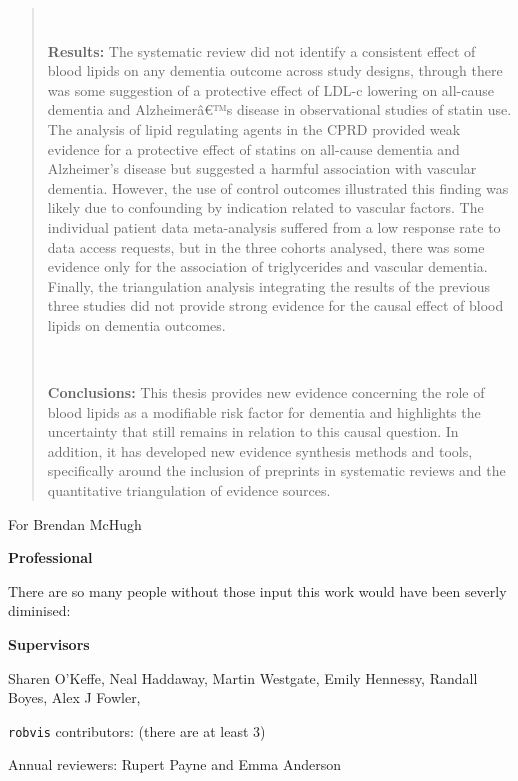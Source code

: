 \documentclass[a4paper, twoside]{templates/ociamthesis}
\begin{document}
\begin{romanpages}
\begin{abstract}
 ~

 \textbf{Results:} The systematic review did not identify a consistent effect of blood lipids on any dementia outcome across study designs, through there was some suggestion of a protective effect of LDL-c lowering on all-cause dementia and Alzheimerâ€™s disease in observational studies of statin use. The analysis of lipid regulating agents in the CPRD provided weak evidence for a protective effect of statins on all-cause dementia and Alzheimer's disease but suggested a harmful association with vascular dementia. However, the use of control outcomes illustrated this finding was likely due to confounding by indication related to vascular factors. The individual patient data meta-analysis suffered from a low response rate to data access requests, but in the three cohorts analysed, there was some evidence only for the association of triglycerides and vascular dementia. Finally, the triangulation analysis integrating the results of the previous three studies did not provide strong evidence for the causal effect of blood lipids on dementia outcomes.

 ~

 \textbf{Conclusions:}
 This thesis provides new evidence concerning the role of blood lipids as a modifiable risk factor for dementia and highlights the uncertainty that still remains in relation to this causal question. In addition, it has developed new evidence synthesis methods and tools, specifically around the inclusion of preprints in systematic reviews and the quantitative triangulation of evidence sources.
\end{abstract}

\begin{dedication}
  For Brendan McHugh
\end{dedication}

\begin{acknowledgements}
 	\textbf{Professional}

  There are so many people without those input this work would have been severly diminised:

  \textbf{Supervisors}

  Sharen O'Keffe, Neal Haddaway, Martin Westgate, Emily Hennessy, Randall Boyes, Alex J Fowler,

  \texttt{robvis} contributors: (there are at least 3)

  Annual reviewers: Rupert Payne and Emma Anderson


\end{acknowledgements}
\end{romanpages}
\end{document}
